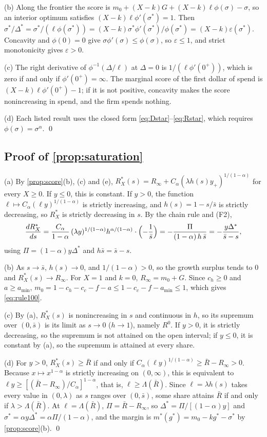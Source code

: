 (b) Along the frontier the score is $m_0+(X-k)G+(X-k)\ell\phi(\sigma)-\sigma$, so an interior optimum satisfies $(X-k)\ell\phi'(\sigma^*)=1$. Then $\sigma^*/\Delta^*=\sigma^*/(\ell\phi(\sigma^*))=(X-k)\sigma^*\phi'(\sigma^*)/\phi(\sigma^*)=(X-k)\varepsilon(\sigma^*)$. Concavity and $\phi(0)=0$ give $\sigma\phi'(\sigma)\le\phi(\sigma)$, so $\varepsilon\le1$, and strict monotonicity gives $\varepsilon>0$.

(c) The right derivative of $\phi^{-1}(\Delta/\ell)$ at $\Delta=0$ is $1/(\ell\phi'(0^+))$, which is zero if and only if $\phi'(0^+)=\infty$. The marginal score of the first dollar of spend is $(X-k)\ell\phi'(0^+)-1$; if it is not positive, concavity makes the score nonincreasing in spend, and the firm spends nothing.

(d) Each listed result uses the closed form \eqref{eq:Dstar}--\eqref{eq:Rstar}, which requires $\phi(\sigma)=\sigma^\alpha$. \qed

\subsection*{Proof of \autoref{prop:saturation}}

(a) By \autoref{prop:score}(b), (c) and (e), $R_X^*(s)=R_\infty+C_\alpha(\lambda h(s)y_+)^{1/(1-\alpha)}$ for every $X\ge 0$. If $y\le 0$, this is constant. If $y>0$, the function $\ell\mapsto C_\alpha(\ell y)^{1/(1-\alpha)}$ is strictly increasing, and $h(s)=1-s/\bar s$ is strictly decreasing, so $R_X^*$ is strictly decreasing in $s$. By the chain rule and (F2),
\[
\frac{dR_X^*}{ds}=\frac{C_\alpha}{1-\alpha}\,(\lambda y)^{1/(1-\alpha)}h^{\alpha/(1-\alpha)}\cdot\Bigl(-\frac{1}{\bar s}\Bigr)=-\frac{\Pi}{(1-\alpha)\,h\,\bar s}=-\frac{y\Delta^*}{\bar s-s},
\]
using $\Pi=(1-\alpha)y\Delta^*$ and $h\bar s=\bar s-s$.

(b) As $s\to\bar s$, $h(s)\to 0$, and $1/(1-\alpha)>0$, so the growth surplus tends to $0$ and $R_X^*(s)\to R_\infty$. For $X=1$ and $k=0$, $R_\infty=m_0+G$. Since $c_h\ge 0$ and $a\ge a_{\min}$, $m_0=1-c_h-c_c-f-a\le 1-c_c-f-a_{\min}\le 1$, which gives \eqref{eq:rule100}.

(c) By (a), $R_X^*(s)$ is nonincreasing in $s$ and continuous in $h$, so its supremum over $(0,\bar s)$ is its limit as $s\to 0$ ($h\to 1$), namely $R^0$. If $y>0$, it is strictly decreasing, so the supremum is not attained on the open interval; if $y\le0$, it is constant by (a), so the supremum is attained at every share.

(d) For $y>0$, $R_X^*(s)\ge\bar R$ if and only if $C_\alpha(\ell y)^{1/(1-\alpha)}\ge\bar R-R_\infty>0$. Because $x\mapsto x^{1-\alpha}$ is strictly increasing on $(0,\infty)$, this is equivalent to $\ell y\ge[(\bar R-R_\infty)/C_\alpha]^{1-\alpha}$, that is, $\ell\ge\Lambda(\bar R)$. Since $\ell=\lambda h(s)$ takes every value in $(0,\lambda)$ as $s$ ranges over $(0,\bar s)$, some share attains $\bar R$ if and only if $\lambda>\Lambda(\bar R)$. At $\ell=\Lambda(\bar R)$, $\Pi=\bar R-R_\infty$, so $\Delta^*=\Pi/[(1-\alpha)y]$ and $\sigma^*=\alpha y\Delta^*=\alpha\Pi/(1-\alpha)$, and the margin is $m^*(g^*)=m_0-kg^*-\sigma^*$ by \autoref{prop:score}(b). \qed

